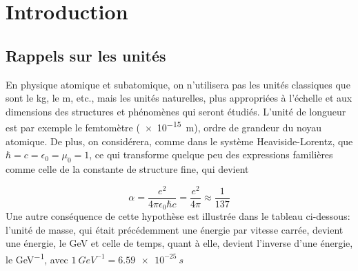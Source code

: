 ﻿\section{Introduction}
\subsection{Rappels sur les unités}
En physique atomique et subatomique, on n'utilisera pas les unités classiques que sont le \si{kg}, le \si{m}, etc., mais les unités naturelles, plus appropriées à l'échelle et aux dimensions des structures et phénomènes qui seront étudiés. L'unité de longueur est par exemple le femtomètre (\SI{e-15}{m}), ordre de grandeur du noyau atomique. De plus, on considérera, comme dans le système Heaviside-Lorentz, que  $\hbar=c=\epsilon_0=\mu_0=1$, ce qui transforme quelque peu des expressions familières comme celle de la constante de structure fine, qui devient

\[
    \alpha=\dfrac{e^2}{4\pi\epsilon_0\hbar c}=\dfrac{e^2}{4\pi}\approx\dfrac{1}{137}
\]
Une autre conséquence de cette hypothèse est illustrée dans le tableau ci-dessous: l'unité de masse, qui était précédemment une énergie par vitesse carrée,  devient une énergie, le \si{GeV} et celle de temps, quant à elle, devient l'inverse d'une énergie, le \si{GeV^{-1}}, avec $\SI{1}{GeV^{-1}}=\SI{6.59e-25}{s}$

